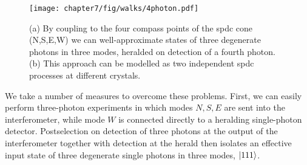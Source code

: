 \begin{figure}[t!]
\centering
\texttt{[image: chapter7/fig/walks/4photon.pdf]}
\caption[Four-photon \acrshort{spdc} source]{
    (a) By coupling to the four compass points of the \gls{spdc} cone (N,S,E,W) we can well-approximate states of three degenerate photons in three modes, heralded on detection of a fourth photon.  (b) This approach can be modelled as two independent \gls{spdc} processes at different crystals.
}
\label{fig:four-photon-source}
\end{figure}


We take a number of measures to overcome these problems. First, we can easily perform three-photon experiments in which modes $N,S,E$ are sent into the interferometer, while mode $W$ is connected directly to a heralding single-photon detector. Postselection on detection of three photons at the output of the interferometer together with detection at the herald then isolates an effective input state of three degenerate single photons in three modes, $\mbox{$ | 111 \rangle $}$.

